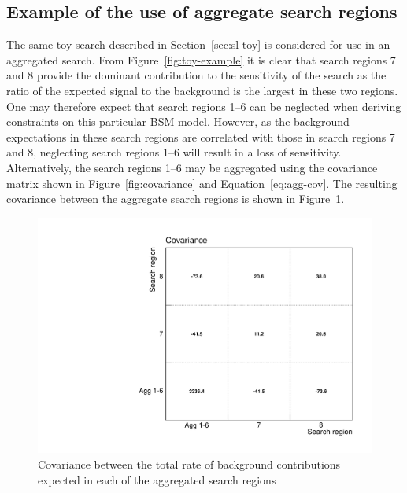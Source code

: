 \subsection{Example of the use of aggregate search regions}
\label{sec:agg-toy}

The same toy search described in Section~\ref{sec:sl-toy} is considered for use in an aggregated search. 
From Figure~\ref{fig:toy-example} it is clear that search regions 7 and 8  provide the dominant contribution to 
the sensitivity of the search as the ratio of the expected signal to the background is the largest in these two regions. 
One may therefore expect that search regions 1--6 can be neglected when deriving constraints on this particular BSM model. 
However, as the background expectations in these search regions are correlated with those in search regions 7 and 8, neglecting search regions 1--6 
will result in a loss of sensitivity.  
Alternatively, the search regions 1--6 may be aggregated using the covariance matrix shown in 
Figure~\ref{fig:covariance} and Equation~\ref{eq:agg-cov}. The resulting covariance
between the aggregate search regions is shown in Figure~\ref{fig:agg-covariance}.

\begin{figure}[hbt]
  \begin{center} 
   \includegraphics[width=1.5\cmsFigWidth]{figures/agg_htsearch_covariance.pdf}
   \caption{Covariance between the total rate of background contributions expected in each of the aggregated search regions}
   \label{fig:agg-covariance} 
  \end{center}
\end{figure}

